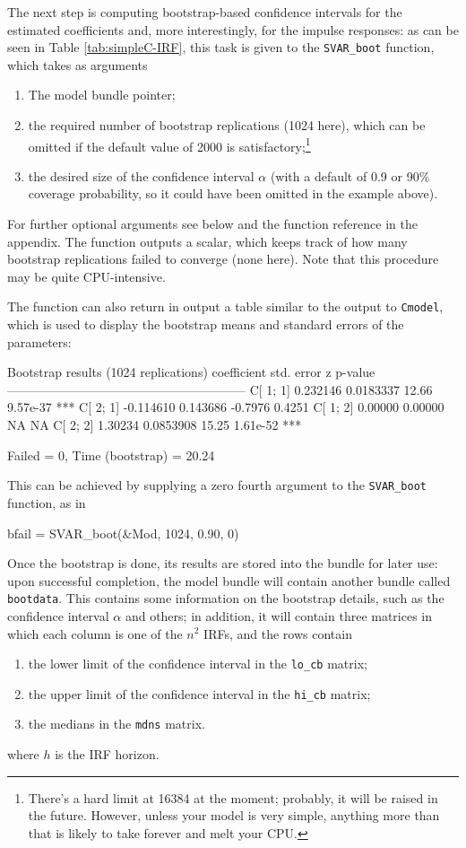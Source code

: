 \documentclass[a4paper,10pt]{article}
\begin{document}
The next step is computing bootstrap-based confidence intervals for
the estimated coefficients and, more interestingly, for the impulse
responses: as can be seen in Table \ref{tab:simpleC-IRF}, this task is
given to the \texttt{SVAR\_boot} function, which takes as arguments
\begin{enumerate}
\item The model bundle pointer;
\item the required number of bootstrap replications (1024
  here), which can be omitted if the default value of 2000 is 
    satisfactory;\footnote{There's a hard limit at 16384 at the moment;
    probably, it will be raised in the future. However, unless your
    model is very simple, anything more than that is likely to take
    forever and melt your CPU.}
\item the desired size of the confidence interval $\alpha$ (with a default 
  of 0.9 or 90\% coverage probability, so it could have been omitted in the 
  example above).
\end{enumerate}

For further optional arguments see below and the function reference in the 
appendix.
The function outputs a scalar, which keeps track of how many bootstrap
replications failed to converge (none here). Note that this procedure
may be quite CPU-intensive. 

The function can also return in output a table similar to the output
to \texttt{Cmodel}, which is used to display the bootstrap means and
standard errors of the parameters:
\begin{code}
Bootstrap results (1024 replications)
             coefficient   std. error      z       p-value 
  ---------------------------------------------------------
  C[ 1; 1]     0.232146    0.0183337    12.66      9.57e-37 ***
  C[ 2; 1]    -0.114610    0.143686     -0.7976    0.4251  
  C[ 1; 2]     0.00000     0.00000      NA        NA       
  C[ 2; 2]     1.30234     0.0853908    15.25      1.61e-52 ***

Failed = 0, Time (bootstrap) = 20.24
\end{code}
This can be achieved by supplying a zero fourth argument to the
\texttt{SVAR\_boot} function, as in
\begin{code}
  bfail = SVAR_boot(&Mod, 1024, 0.90, 0)
\end{code}

Once the bootstrap is done, its results are stored into the bundle for
later use: upon successful completion, the model bundle will
contain another bundle called
\texttt{bootdata}. This contains some information on the bootstrap
details, such as the confidence interval $\alpha$ and others; in
addition, it will contain three matrices in which each column is one
of the $n^2$ IRFs, and the rows contain
\begin{enumerate}
\item the lower limit of the confidence interval in the
  \texttt{lo\_cb} matrix;
\item the upper limit of the confidence interval in the
  \texttt{hi\_cb} matrix;
\item the medians in the \texttt{mdns} matrix.
\end{enumerate}
where $h$ is the IRF horizon.
\end{document}

